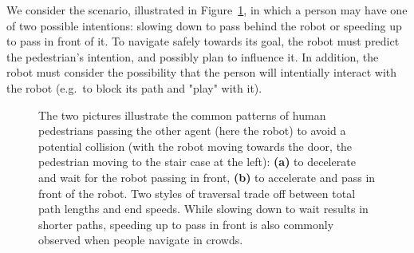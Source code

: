 \documentclass[conference]{IEEEtran}
\begin{document}
We consider the scenario, illustrated in Figure~\ref{fig1}, in which a
person may have one of two possible intentions: slowing down to pass
behind the robot or speeding up to pass in front of it.  To navigate
safely towards its goal, the robot must predict the pedestrian's
intention, and possibly plan to influence it.  In addition, the robot
must consider the possibility that the person will intentially
interact with the robot (e.g.\ to block its path and "play" with it).


\begin{figure}[t]
  \begin{center}
  \hspace*{-1em}
  \hspace*{-0.03em}
  \end{center}
  \vspace{-0.85em}
  \caption{The two pictures illustrate the common patterns of human 
    pedestrians passing the other agent (here the robot) to avoid a potential 
    collision (with the robot 
    moving towards the door, the pedestrian moving to the stair case at the left): {\bf (a)} to 
    decelerate and wait for the robot passing in front, 
    {\bf (b)} to accelerate and pass in front of the robot. Two styles of 
    traversal trade off between total path lengths and end speeds. While 
    slowing down to wait results in shorter paths, speeding up to pass in 
    front is also commonly observed when people navigate in crowds. 
    }  
  \vspace{-0.6em}
\label{fig1}
\end{figure}
\end{document}
